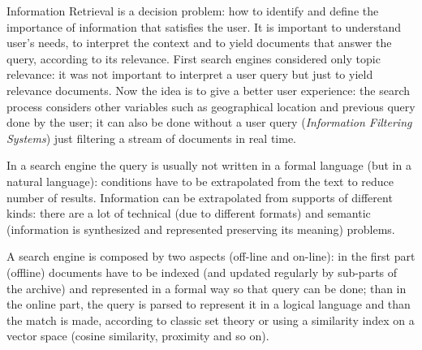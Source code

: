 \documentclass[11pt, a4page]{article}
\begin{document}
Information Retrieval is a decision problem: how to identify and define the importance of information that satisfies the user.
It is important to understand user's needs, to interpret the context and to yield documents that answer the query, according to its relevance.
First search engines considered only topic relevance: it was not important to interpret a user query but just to yield relevance documents.
Now the idea is to give a better user experience: the search process considers other variables such as geographical location and previous query done by the user; it can also be done without a user query (\textit{Information Filtering Systems}) just filtering a stream of documents in real time.

In a search engine the query is usually not written in a formal language (but in a natural language): conditions have to be extrapolated from the text to reduce number of results.
Information can be extrapolated from supports of different kinds: there are a lot of technical (due to different formats) and semantic (information is synthesized and represented preserving its meaning) problems.

A search engine is composed by two aspects (off-line and on-line): in the first part (offline) documents have to be indexed (and updated regularly by sub-parts of the archive) and represented in a formal way so that query can be done; than in the online part, the query is parsed to represent it in a logical language and than the match is made, according to classic set theory or using a similarity index on a vector space (cosine similarity, proximity and so on).
\end{document}
